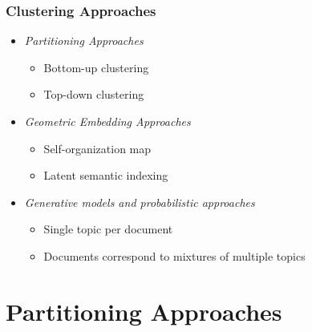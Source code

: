 \documentclass{beamer}
\begin{document}



\begin{frame}
  \frametitle{Clustering Approaches}

  \begin{itemize}
  \item \emph{Partitioning Approaches}
    \begin{itemize}
    \item Bottom-up clustering
    \item Top-down clustering
    \end{itemize}
  \item \emph{Geometric Embedding Approaches}
    \begin{itemize}
    \item Self-organization map
    \item Latent semantic indexing
    \end{itemize}
  \item \emph{Generative models and probabilistic approaches}
    \begin{itemize}
    \item Single topic per document
    \item Documents correspond to mixtures of multiple topics
    \end{itemize}
  \end{itemize}

\end{frame}


\section{Partitioning Approaches}
\end{document}
